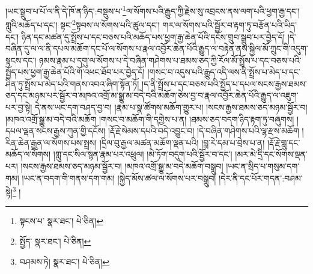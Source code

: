 །ཡང་སྒྲུབ་པ་པོ་ལ་ནི་དེ་ཁོ་ན་ཉིད་:བསྡུས་པ་\footnote{སྟངས་པ་  སྣར་ཐང་།  པེ་ཅིན། }ལ་སོགས་པའི་རྒྱུད་ཀྱི་རྗེས་སུ་འབྲངས་ནས་ལག་པའི་ཕྱག་རྒྱ་དང་། གླུའི་མཆོད་པ་དང་། སྟང་\footnote{སྤྱོད་  སྣར་ཐང་།  པེ་ཅིན། }སྟབས་ལ་སོགས་པའི་ཚུལ་དང་། གར་ལ་སོགས་པའི་སྦྱོར་བ་རྟག་ཏུ་བརྩོན་པའི་ཡིད་དང་། ཉིན་དང་མཚན་དུ་སྤྲོས་པ་དང་བཅས་པའི་མཆོད་པས་ཕྱག་རྒྱ་ཆེན་པོའི་དངོས་གྲུབ་སྒྲུབ་པར་བྱེད་དོ། །དེ་བཞིན་དུ་ལ་ལ་ནི་དཔལ་མཆོག་དང་པོ་ལ་སོགས་པ་རྣལ་འབྱོར་ཆེན་པོའི་རྒྱུད་ལ་བརྟེན་ནས་སྐྱིལ་མོ་ཀྲུང་གི་འདུག་སྟངས་དང་། ཉམས་རྣམ་པ་དགུ་ལ་སོགས་པ་དེ་བཞིན་གཤེགས་པ་ཐམས་ཅད་ཀྱི་རོལ་མོ་སྤྲོས་པ་དང་བཅས་པའི་སྤྱོད་པས་ཕྱག་རྒྱ་ཆེན་པོའི་གོ་འཕང་ཐོབ་པར་བྱེད་དོ། །གསང་བ་འདུས་པའི་རྒྱུད་འདི་ལས་ནི་སྤྲོས་པ་མེད་པ་དང་ཤིན་ཏུ་སྤྲོས་པ་མེད་པའི་གནས་འབའ་ཞིག་སྟོན་ཏོ། །ད་ནི་སྤྲོས་པ་དང་བཅས་པའི་སྤྱོད་པ་དཔལ་སངས་རྒྱས་ཐམས་ཅད་དང་མཉམ་པར་སྦྱོར་བ་མཁའ་འགྲོ་མ་སྒྱུ་མ་བདེ་བའི་མཆོག་ཅེས་བྱ་བ་རྣལ་འབྱོར་ཆེན་པོའི་རྒྱུད་ལ་འཇུག་པར་བྱ་སྟེ། དེ་ནས་ཡང་དག་བཤད་བྱ་བ། །རྣམ་པ་སྣ་ཚོགས་མཆོག་གྱུར་པ། །སངས་རྒྱས་ཐམས་ཅད་མཉམ་སྦྱོར་བ། །མཁའ་འགྲོ་སྒྱུ་མ་བདེ་བའི་མཆོག །གསང་བ་མཆོག་གི་དགྱེས་པ་ན། །ཐམས་ཅད་བདག་ཉིད་རྟག་ཏུ་བཞུགས། །དཔལ་ལྡན་སངས་རྒྱས་ཀུན་གྱི་དངོས། །རྡོ་རྗེ་སེམས་དཔའི་བདེ་འབྱུང་བ། །དེ་བཞིན་གཤེགས་པའི་ལྷ་རྫས་མཆོག །རིན་ཆེན་རྒྱན་ལ་སོགས་པས་སྤྲས། །དྲིལ་བུ་རྒྱལ་མཚན་མཆོག་ལྡན་པའི། །བླ་རེ་དམ་པ་བྲེས་པ་ན། །རྡོ་རྗེ་གླུ་དང་མཆོད་ལ་སོགས། །གླུ་དང་སིལ་སྙན་རྣམ་པར་འཕྲུལ། །མེ་ཏོག་བདུག་པའི་སྦྱོར་བ་དང་། །མར་མེ་དྲི་དང་སོགས་ལྡན་པར། །སངས་རྒྱས་ཐམས་ཅད་མཉམ་སྦྱོར་བ། །མཁའ་འགྲོ་སྒྱུ་མ་བདེ་མཆོག་བསྒྲུབ། །ཡང་ན་སྲིད་པ་གསུམ་དག་གམ། །ཡང་ན་བདག་གི་གནས་དག་གམ། །སྐྱེད་མོས་ཚལ་ལ་སོགས་པར་བསྒྲུབ། །དེར་ནི་དང་པོར་གདན་:བཤམ་སྟེ།\footnote{བཤམས་ཏེ།  སྣར་ཐང་།  པེ་ཅིན། } །

